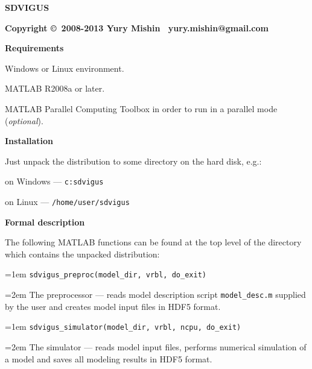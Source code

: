 \documentclass[a4paper,onesided,12pt]{letter}
\begin{document}
\begin{center}
{\LARGE\bfseries\sffamily
SDVIGUS }

{\bfseries\sffamily
Copyright \copyright\ 2008-2013 Yury Mishin \textbar\ yury.mishin@gmail.com}
\end{center}

\makebox[\textwidth]{
\rule{1.05\linewidth}{0.35mm}}

\begin{list}{}{\leftmargin=1em}

\item \textbf{Requirements}

\begin{list}{}{\leftmargin=1em}

\item Windows or Linux environment.

\item MATLAB R2008a or later.

\item MATLAB Parallel Computing Toolbox in order to run in a parallel mode (\textsl{optional}).

\end{list}

\item \textbf{Installation}

Just unpack the distribution to some directory on the hard disk, e.g.:

on Windows --- \texttt{c:sdvigus}

on Linux --- \texttt{/home/user/sdvigus}

\item \textbf{Formal description}

The following MATLAB functions can be found at the top level of the directory which contains the unpacked distribution:

\leftskip=1em \texttt{sdvigus\_preproc(model\_dir, vrbl, do\_exit)}

\leftskip=2em The preprocessor --- reads model description script \texttt{model\_desc.m} supplied by the user and creates model input files in HDF5 format.

\leftskip=1em \texttt{sdvigus\_simulator(model\_dir, vrbl, ncpu, do\_exit)}

\leftskip=2em The simulator --- reads model input files, performs numerical simulation of a model and saves all modeling results in HDF5 format.


\end{list}
\end{document}

